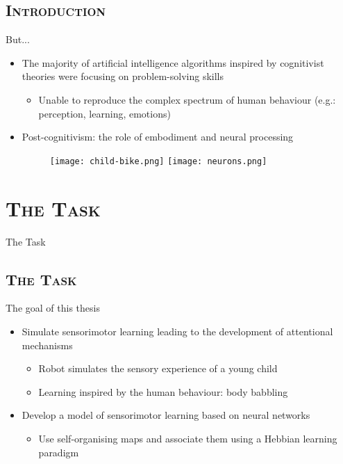 \documentclass[xcolor=x11names,dvipsnames,compress]{beamer}
\renewcommand{\(}{\begin{columns}}
\renewcommand{\)}{\end{columns}}
\newcommand{\<}[1]{\begin{column}{#1}}
\renewcommand{\>}{\end{column}}
\begin{document}
\subsection{\scshape Introduction}
\begin{frame}{But...}
\begin{itemize}
 \item The majority of artificial intelligence algorithms inspired by cognitivist theories were focusing on problem-solving skills 
    \begin{itemize}
     \item Unable to reproduce the complex spectrum of human behaviour (e.g.: perception, learning, emotions)
    \end{itemize}
 \item Post-cognitivism: the role of embodiment and neural processing 
 \begin{figure}
\texttt{[image: child-bike.png]} 
\hspace{1cm}
\texttt{[image: neurons.png]}  
 \end{figure}
\end{itemize}
\end{frame}

\section{\scshape The Task}
\begin{frame}[noframenumbering]
\Large The Task
\end{frame}


\subsection{\scshape The Task}
\begin{frame}{The goal of this thesis}
\begin{itemize}
 \item Simulate sensorimotor learning leading to the development of attentional mechanisms
 \begin{itemize}
  \item Robot simulates the sensory experience of a young child
  \item Learning inspired by the human behaviour: body babbling  
 \end{itemize}
 \item Develop a model of sensorimotor learning based on neural networks 
 \begin{itemize}
  \item Use self-organising maps and associate them using a Hebbian learning paradigm
 \end{itemize}
\end{itemize}
\end{frame}
\end{document}
